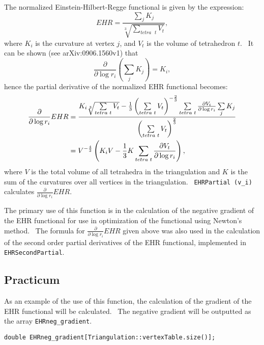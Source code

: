 The normalized Einstein-Hilbert-Regge functional is given by the expression:%
\begin{equation*}
EHR=\frac{\sum\limits_{j}K_{j}}{\sqrt[3]{\sum\limits_{tetra\text{ }t}V_{t}}},
\end{equation*}%
where $K_{i}$ is the curvature at vertex $j$, and $V_{t}$ is the volume of
tetrahedron $t$. \ It can be shown (see arXiv:0906.1560v1) that 
\begin{equation*}
\frac{\partial }{\partial \log r_{i}}\left( \sum\limits_{j}K_{j}\right)
=K_{i},
\end{equation*}%
hence the partial derivative of the normalized EHR functional becomes:%
\begin{align*}
\frac{\partial }{\partial \log r_{i}}EHR& =\frac{K_{i}\sqrt[3]{%
\sum\limits_{tetra\text{ }t}V_{t}}-\frac{1}{3}\left( \sum\limits_{tetra\text{
}t}V_{t}\right) ^{-\frac{2}{3}}\sum\limits_{tetra\text{ }t}\frac{\partial
V_{t}}{\partial \log r_{i}}\sum\limits_{j}K_{j}}{\left( \sum\limits_{tetra%
\text{ }t}V_{t}\right) ^{\frac{2}{3}}} \\
& =V^{-\frac{4}{3}}\left( K_{i}V-\frac{1}{3}K\sum\limits_{tetra\text{ }t}%
\frac{\partial V_{t}}{\partial \log r_{i}}\right) ,
\end{align*}%
where $V$ is the total volume of all tetrahedra in the triangulation and $K$
is the sum of the curvatures over all vertices in the triangulation. \ 
\texttt{EHRPartial (v\_i)} calculates $\frac{\partial }{\partial \log r_{i}}%
EHR$. \ 

The primary use of this function is in the calculation of the negative
gradient of the EHR functional for use in optimization of the functional
using Newton's method. \ The formula for $\frac{\partial }{\partial \log
r_{i}}EHR$ given above was also used in the calculation of the second order
partial derivatives of the EHR functional, implemented in \texttt{%
EHRSecondPartial}.

\subsection*{Practicum}

As an example of the use of this function, the calculation of the gradient
of the EHR functional will be calculated. \ The negative gradient will be
outputted as the array \texttt{EHRneg\_gradient}.

\bigskip

\qquad\texttt{double EHRneg\_gradient[Triangulation::vertexTable.size()];}

